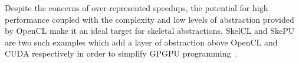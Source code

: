 Despite the concerns of over-represented speedups, the potential for high performance coupled with the complexity and low levels of abstraction provided by OpenCL make it an ideal target for skeletal abstractions. SkelCL and SkePU are two such examples which add a layer of abstraction above OpenCL and CUDA respectively in order to simplify GPGPU programming~\cite{Enmyren2010}.











